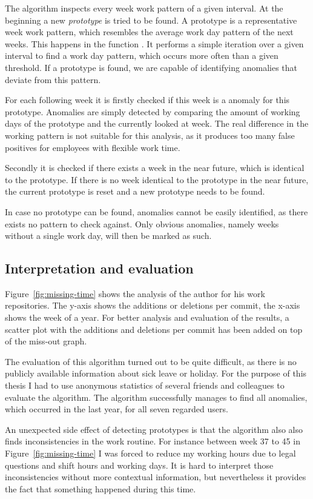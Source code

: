 The algorithm inspects every week work pattern of a given interval.
At the beginning a new \emph{prototype} is tried to be found.
A prototype is a representative week work pattern, which resembles the average work day pattern of the next weeks.
This happens in the function .
It performs a simple iteration over a given interval to find a work day pattern, which occurs more often than a given threshold.
If a prototype is found, we are capable of identifying anomalies that deviate from this pattern.

For each following week it is firstly checked if this week is a anomaly for this prototype.
Anomalies are simply detected by comparing the amount of working days of the prototype and the currently looked at week.
The real difference in the working pattern is not suitable for this analysis, as it produces too many false positives for employees with flexible work time.

Secondly it is checked if there exists a week in the near future, which is identical to the prototype.
If there is no week identical to the prototype in the near future, the current prototype is reset and a new prototype needs to be found.

In case no prototype can be found, anomalies cannot be easily identified, as there exists no pattern to check against.
Only obvious anomalies, namely weeks without a single work day, will then be marked as such.


\subsection{Interpretation and evaluation}

Figure~\ref{fig:missing-time} shows the analysis of the author for his work repositories.
The y-axis shows the additions or deletions per commit, the x-axis shows the week of a year.
For better analysis and evaluation of the results, a scatter plot with the additions and deletions per commit has been added on top of the miss-out graph.

The evaluation of this algorithm turned out to be quite difficult, as there is no publicly available information about sick leave or holiday.
For the purpose of this thesis I had to use anonymous statistics of several friends and colleagues to evaluate the algorithm.
The algorithm successfully manages to find all anomalies, which occurred in the last year, for all seven regarded users.

An unexpected side effect of detecting prototypes is that the algorithm also also finds inconsistencies in the work routine.
For instance between week 37 to 45 in Figure~\ref{fig:missing-time} I was forced to reduce my working hours due to legal questions and shift hours and working days.
It is hard to interpret those inconsistencies without more contextual information, but nevertheless it provides the fact that something happened during this time.

